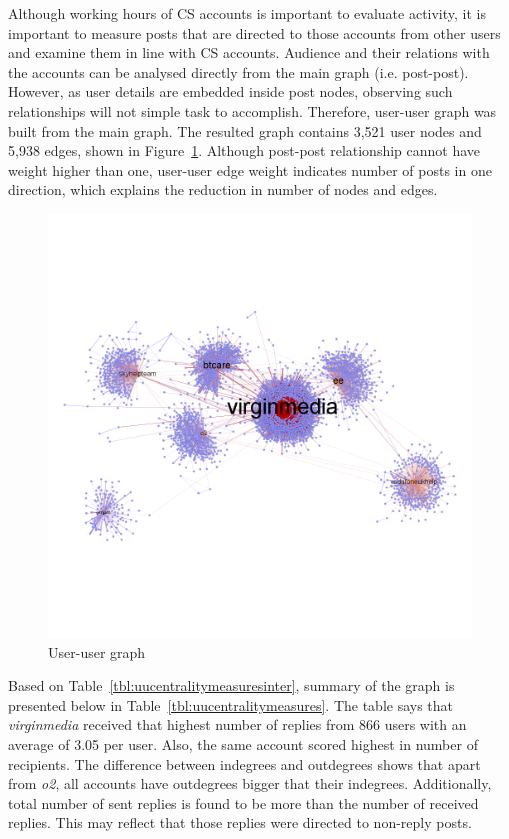 \documentclass[sigconf]{acmart}
\begin{document}
Although working hours of CS accounts is important to evaluate
activity, it is important to measure posts that are directed to those
accounts from other users and examine them in line with CS
accounts. Audience and their relations with the accounts can be
analysed directly from the main graph (i.e. post-post). However, as
user details are embedded inside post nodes, observing such
relationships will not simple task to accomplish. Therefore, user-user
graph was built from the main graph. The resulted graph contains 3,521
user nodes and 5,938 edges, shown in
Figure~\ref{fig:userusergraph}. Although post-post relationship cannot
have weight higher than one, user-user edge weight indicates number of
posts in one direction, which explains the reduction in number of
nodes and edges.

\begin{figure}[htb]
\centering
\includegraphics[width=\columnwidth]{images/userusergraph.png}
\caption{User-user graph}
\label{fig:userusergraph}
\end{figure}

Based on Table~\ref{tbl:uucentralitymeasuresinter}, summary of the
graph is presented below in Table~\ref{tbl:uucentralitymeasures}. The
table says that {\emph{virginmedia}} received that highest number of
replies from 866 users with an average of 3.05 per user. Also, the
same account scored highest in number of recipients. The difference
between indegrees and outdegrees shows that apart from {\emph{o2}},
all accounts have outdegrees bigger that their
indegrees. Additionally, total number of sent replies is found to be
more than the number of received replies. This may reflect that those
replies were directed to non-reply posts.
\end{document}
